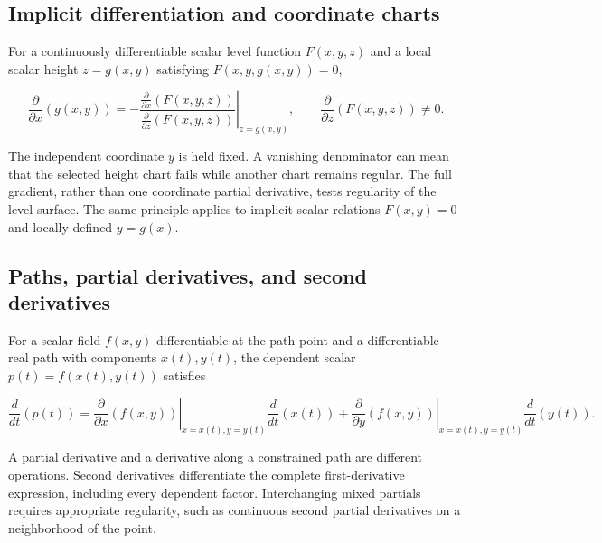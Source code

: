 \documentclass[11pt,oneside,openany]{book}
\begin{document}
\par\addvspace{8pt}\noindent\begin{minipage}{\linewidth}
\subsection{Implicit differentiation and coordinate charts}

For a continuously differentiable scalar level function \(F(x,y,z)\) and a local
scalar height \(z=g(x,y)\) satisfying \(F(x,y,g(x,y))=0\),

\[
\frac{\partial}{\partial x}\left(g(x,y)\right)
=-\left.\frac{\frac{\partial}{\partial x}(F(x,y,z))}{\frac{\partial}{\partial z}(F(x,y,z))}\right|_{z=g(x,y)},
\qquad \frac{\partial}{\partial z}\left(F(x,y,z)\right)\ne0.
\]

The independent coordinate \(y\) is held fixed. A vanishing denominator can mean
that the selected height chart fails while another chart remains regular.
The full gradient, rather than one coordinate partial derivative, tests regularity
of the level surface. The same principle applies to implicit scalar relations
\(F(x,y)=0\) and locally defined \(y=g(x)\).

\end{minipage}\par
\par\addvspace{8pt}\noindent\begin{minipage}{\linewidth}
\subsection{Paths, partial derivatives, and second derivatives}

For a scalar field \(f(x,y)\) differentiable at the path point and a
differentiable real path with components \(x(t),y(t)\), the dependent scalar
\(p(t)=f(x(t),y(t))\) satisfies

\[
\frac{d}{dt}\left(p(t)\right)
=\left.\frac{\partial}{\partial x}(f(x,y))\right|_{x=x(t),y=y(t)}\frac{d}{dt}(x(t))
+\left.\frac{\partial}{\partial y}(f(x,y))\right|_{x=x(t),y=y(t)}\frac{d}{dt}(y(t)).
\]

A partial derivative and a derivative along a constrained path are different
operations. Second derivatives differentiate the complete first-derivative
expression, including every dependent factor. Interchanging mixed partials
requires appropriate regularity, such as continuous second partial derivatives
on a neighborhood of the point.

\end{minipage}\par
\end{document}

